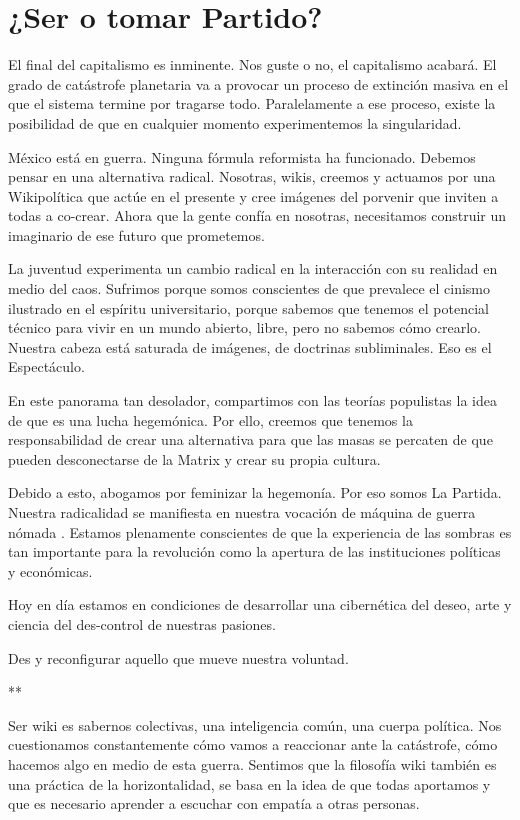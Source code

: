 \hypertarget{ser-o-tomar-partido}{%
\section{¿Ser o tomar Partido?}\label{ser-o-tomar-partido}}

El final del capitalismo es inminente. Nos guste o no, el capitalismo
acabará. El grado de catástrofe planetaria va a provocar un proceso de
extinción masiva en el que el sistema termine por tragarse todo.
Paralelamente a ese proceso, existe la posibilidad de que en cualquier
momento experimentemos la singularidad.

México está en guerra. Ninguna fórmula reformista ha funcionado. Debemos
pensar en una alternativa radical. Nosotras, wikis, creemos y actuamos
por una Wikipolítica que actúe en el presente y cree imágenes del
porvenir que inviten a todas a co-crear. Ahora que la gente confía en
nosotras, necesitamos construir un imaginario de ese futuro que
prometemos.

La juventud experimenta un cambio radical en la interacción con su
realidad en medio del caos. Sufrimos porque somos conscientes de que
prevalece el cinismo ilustrado en el espíritu universitario, porque
sabemos que tenemos el potencial técnico para vivir en un mundo abierto,
libre, pero no sabemos cómo crearlo. Nuestra cabeza está saturada de
imágenes, de doctrinas subliminales. Eso es el Espectáculo.

En este panorama tan desolador, compartimos con las teorías populistas
la idea de que es una lucha hegemónica. Por ello, creemos que tenemos la
responsabilidad de crear una alternativa para que las masas se percaten
de que pueden desconectarse de la Matrix y crear su propia cultura.

Debido a esto, abogamos por feminizar la hegemonía. Por eso somos La
Partida. Nuestra radicalidad se manifiesta en nuestra vocación de
máquina de guerra nómada \cite{Negri2013}. Estamos
plenamente conscientes de que la experiencia de las sombras es tan
importante para la revolución como la apertura de las instituciones
políticas y económicas.

Hoy en día estamos en condiciones de desarrollar una cibernética del
deseo, arte y ciencia del des-control de nuestras pasiones.

Des y reconfigurar aquello que mueve nuestra voluntad.

**

Ser wiki es sabernos colectivas, una inteligencia común, una cuerpa
política. Nos cuestionamos constantemente cómo vamos a reaccionar ante
la catástrofe, cómo hacemos algo en medio de esta guerra. Sentimos que
la filosofía wiki también es una práctica de la horizontalidad, se basa
en la idea de que todas aportamos y que es necesario aprender a escuchar
con empatía a otras personas.

